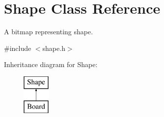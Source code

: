 \hypertarget{class_shape}{}\section{Shape Class Reference}
\label{class_shape}


A bitmap representing shape.  




{\ttfamily \#include $<$shape.\+h$>$}

Inheritance diagram for Shape\+:\begin{figure}[H]
\begin{center}
\leavevmode
\includegraphics[height=2.000000cm]{class_shape}
\end{center}
\end{figure}
